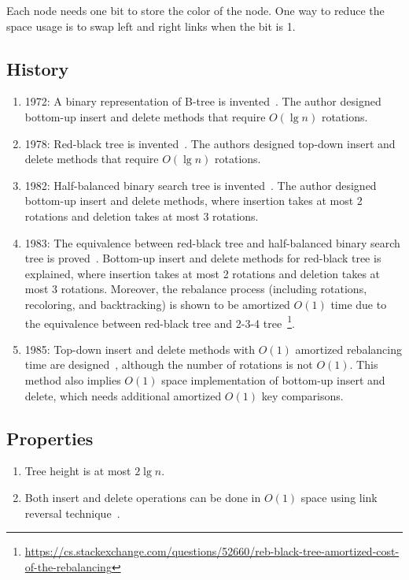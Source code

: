 Each node needs one bit to store the color of the node. One way to reduce the space usage is to swap left and right links when the bit is 1.

\subsection{History}
\begin{enumerate}
    \item 1972: A binary representation of B-tree is invented~\cite{Bayer1972}. The author designed bottom-up insert and delete methods that require $O(\lg n)$ rotations.
    \item 1978: Red-black tree is invented~\cite{Guibas1978}. The authors designed top-down insert and delete methods that require $O(\lg n)$ rotations.
    \item 1982: Half-balanced binary search tree is invented~\cite{Olivie1982}. The author designed bottom-up insert and delete methods, where insertion takes at most 2 rotations and deletion takes at most 3 rotations.
    \item 1983: The equivalence between red-black tree and half-balanced binary search tree is proved~\cite{Tarjan1983}. Bottom-up insert and delete methods for red-black tree is explained, where insertion takes at most 2 rotations and deletion takes at most 3 rotations. Moreover, the rebalance process (including rotations, recoloring, and backtracking) is shown to be amortized $O(1)$ time due to the equivalence between red-black tree and 2-3-4 tree~\footnote{\url{https://cs.stackexchange.com/questions/52660/reb-black-tree-amortized-cost-of-the-rebalancing}}.
    \item 1985: Top-down insert and delete methods with $O(1)$ amortized rebalancing time are designed~\cite{Tarjan1985}, although the number of rotations is not $O(1)$. This method also implies $O(1)$ space implementation of bottom-up insert and delete, which needs additional amortized $O(1)$ key comparisons.
\end{enumerate}

\subsection{Properties}
\begin{enumerate}
    \item Tree height is at most $2 \lg n$.
    \item Both insert and delete operations can be done in $O(1)$ space using link reversal technique~\cite{Chen1996}.
\end{enumerate}

